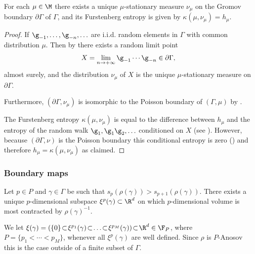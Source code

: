 
\begin{theorem}\label{furstenberg}
For each \(\mu \in \M\) there exists a unique \(\mu\)-stationary measure \(\nu_\mu\) on the Gromov boundary \(\partial \Gamma\) of \(\Gamma\), and its Furstenberg entropy is given by \(\kappa(\mu,\nu_\mu) = h_\mu\).
\end{theorem}
\begin{proof}
If \(\g_{-1},\ldots, \g_{-n},\ldots\) are i.i.d. random elements in \(\Gamma\) with common distribution \(\mu\). Then by \cite[Th.\,7.6]{Kai00} there exists a random limit point
\[
X = \lim_{n \to +\infty}\g_{-1}\cdots \g_{-n} \in \partial\Gamma,
\]
almost surely, and the distribution \(\nu_\mu\) of \(X\) is the unique \(\mu\)-stationary measure on \(\partial \Gamma\).

Furthermore, \((\partial \Gamma,\nu_\mu)\) is isomorphic to the Poisson boundary of \((\Gamma,\mu)\) by \cite[Th.\,7.7]{Kai00}.

The Furstenberg entropy \(\kappa(\mu,\nu_\mu)\) is equal to the difference between \(h_\mu\) and the entropy of the random walk \(\g_1, \g_1\g_2,\ldots\) conditioned on \(X\) (see \cite[Cor.\,2]{KV83}). However, because \((\partial \Gamma,\nu)\) is the Poisson boundary this conditional entropy is zero (\cite[Th.\,4.3 and 4.5]{Kai00}) and therefore \(h_\mu = \kappa(\mu,\nu_\mu)\) as claimed.
\end{proof}

\subsubsection{Boundary maps}

Let \(p \in P \) and \(\gamma \in \Gamma\) be such that \(s_p(\rho(\gamma)) > s_{p+1}(\rho(\gamma))\).
There exists a unique \(p\)-dimensional subspace \(\xi^p(\gamma) \subset \R^d\) on which \(p\)-dimensional volume is most contracted by \(\rho(\gamma)^{-1}\).

We let \(\xi(\gamma) = (\{0\} \!\subset\! \xi^{p_1}(\gamma) \!\subset\! \ldots \!\subset\! \xi^{p_{M}}(\gamma))\!\subset\! \R^d \in \F_P\), where \hbox{\(P = \lbrace p_1 < \cdots < p_{M} \rbrace\)}, whenever all \(\xi^p(\gamma)\) are well defined.
Since \(\rho\) is \(P\)-Anosov this is the case outside of a finite subset of \(\Gamma\).

